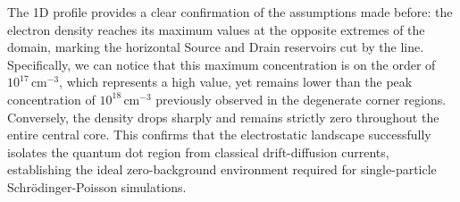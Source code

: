 The 1D profile provides a clear confirmation of the assumptions made before: the electron density reaches its maximum values at the opposite extremes of the domain, marking the horizontal Source and Drain reservoirs cut by the line. Specifically, we can notice that this maximum concentration is on the order of $10^{17}\,\text{cm}^{-3}$, which represents a high value, yet remains lower than the peak concentration of $10^{18}\,\text{cm}^{-3}$ previously observed in the degenerate corner regions. Conversely, the density drops sharply and remains strictly zero throughout the entire central core. This confirms that the electrostatic landscape successfully isolates the quantum dot region from classical drift-diffusion currents, establishing the ideal zero-background environment required for single-particle Schrödinger-Poisson simulations.

